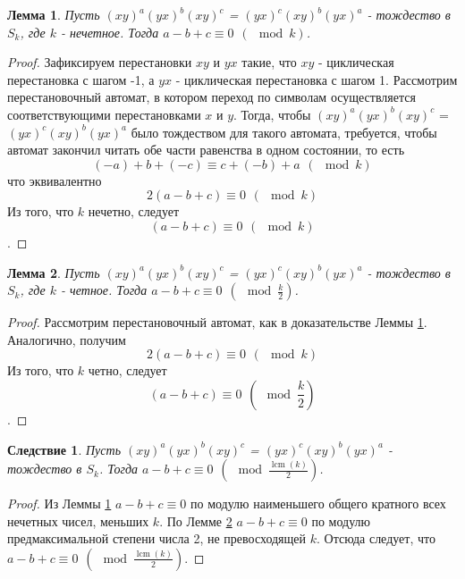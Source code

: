 \documentclass[12pt]{article}
\newtheorem{lemma}{Лемма}
\newtheorem{corollary}{Следствие}
\DeclareMathOperator{\lcm}{lcm}
\begin{document}
	\begin{lemma} \label{a-b+c is 0 for odd}
		Пусть $(xy)^a(yx)^b(xy)^c$ = $(yx)^c(xy)^b(yx)^a$ - тождество в $S_k$, где $k$ - нечетное. Тогда $a - b + c \equiv 0 \hspace{5pt} (\mod k)$.
	\end{lemma}
	\begin{proof}
		Зафиксируем перестановки $xy$ и $yx$ %
		такие, что $xy$ - циклическая перестановка с шагом -1, а $yx$ - циклическая перестановка с шагом 1.
		Рассмотрим перестановочный автомат, в котором переход по символам осуществляется соответствующими перестановками $x$ и $y$. Тогда, чтобы $(xy)^a(yx)^b(xy)^c$ = $(yx)^c(xy)^b(yx)^a$ было тождеством для такого автомата, требуется, чтобы автомат закончил читать обе части равенства в одном состоянии, то есть	
		\begin{equation}
		(-a) + b + (-c) \equiv c + (-b) + a \hspace{5pt} (\mod k)
		\end{equation}
		что эквивалентно 
		\begin{equation}
		2(a - b + c) \equiv 0 \hspace{5pt} (\mod k)
		\end{equation}
		Из того, что $k$ нечетно, следует 
		$$
		(a - b + c) \equiv 0 \hspace{5pt} (\mod k)
		$$.
	\end{proof}

	\begin{lemma} \label{a-b+c is 0 for even}
		Пусть $(xy)^a(yx)^b(xy)^c$ = $(yx)^c(xy)^b(yx)^a$ - тождество в $S_k$, где $k$ - четное. Тогда $a - b + c \equiv 0 \hspace{5pt} (\mod \frac{k}{2})$.
	\end{lemma}
	\begin{proof}
		Рассмотрим перестановочный автомат, как в доказательстве Леммы \ref{a-b+c is 0 for odd}. Аналогично, получим	
		\begin{equation}
		2(a - b + c) \equiv 0 \hspace{5pt} (\mod k)
		\end{equation}
		Из того, что $k$ четно, следует 
		$$
		(a - b + c) \equiv 0 \hspace{5pt} (\mod \frac{k}{2})
		$$.
	\end{proof}

	\begin{corollary} \label{a-b+c is 0 mod lcm/2}
		Пусть $(xy)^a(yx)^b(xy)^c$ = $(yx)^c(xy)^b(yx)^a$ - тождество в $S_k$. Тогда $a - b + c \equiv 0 \hspace{5pt} (\mod \frac{\lcm(k)}{2})$.
	\end{corollary}
	\begin{proof}
		Из Леммы \ref{a-b+c is 0 for odd} $a - b + c \equiv 0$ по модулю наименьшего общего кратного всех нечетных чисел, меньших $k$.
		По Лемме \ref{a-b+c is 0 for even} $a - b + c \equiv 0$ по модулю предмаксимальной степени числа 2, не превосходящей $k$.
		Отсюда следует, что $a - b + c \equiv 0 \hspace{5pt} (\mod \frac{\lcm(k)}{2})$.
	\end{proof}
\end{document}
